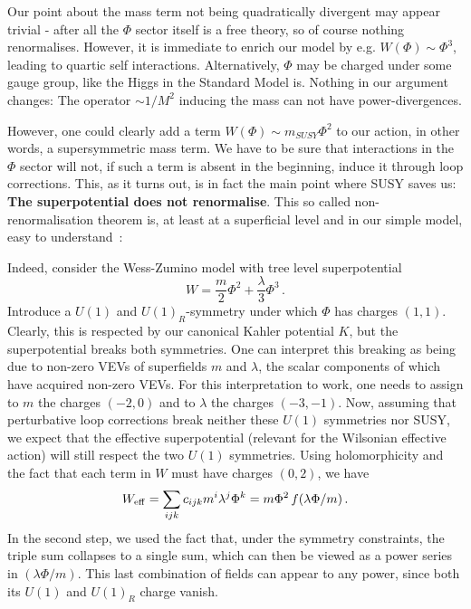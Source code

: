 \documentclass[12pt]{article}
\newcommand{\be}{\begin{equation}}
\newcommand{\ee}{\end{equation}}
\numberwithin{equation}{section}
\begin{document}
Our point about the mass term not being quadratically divergent may appear trivial - after all the $\Phi$ sector itself is a free theory, so of course nothing renormalises. However, it is immediate to enrich our model by e.g. $W(\Phi)\sim \Phi^3$, leading to quartic self interactions. Alternatively, $\Phi$ may be charged under some gauge group, like the Higgs in the Standard Model is. Nothing in our argument changes: The operator $\sim 1/M^2$ inducing the mass can not have power-divergences. 

However, one could clearly add a term $W(\Phi)\sim m_{SUSY}\Phi^2$ to our action, in other words, a supersymmetric mass term. We have to be sure that interactions in the $\Phi$ sector will not, if such a term is absent in the beginning, induce it through loop corrections. This, as it turns out, is in fact the main point where SUSY saves us: {\bf The superpotential does not renormalise}. This so called non-renormalisation theorem is, at least at a superficial level and in our simple model, easy to understand~\cite{Seiberg:1993vc}: 

Indeed, consider the Wess-Zumino model with tree level superpotential 
\be
W=\frac{m}{2}\Phi^2+\frac{\lambda}{3}\Phi^3\,.\label{mlf}
\ee
Introduce a $U(1)$ and $U(1)_R$-symmetry under which $\Phi$ has charges $(1,1)$. Clearly, this is respected by our canonical Kahler potential $K$, but the superpotential breaks both symmetries. One can interpret this breaking as being due to non-zero VEVs of superfields $m$ and $\lambda$, the scalar components of which have acquired non-zero VEVs. For this interpretation to work, one needs to assign to $m$ the charges $(-2,0)$ and to $\lambda$ the charges $(-3,-1)$. Now, assuming that perturbative loop corrections break neither these $U(1)$ symmetries nor SUSY, we expect that the effective superpotential (relevant for the Wilsonian effective action) will still respect the two $U(1)$ symmetries. Using holomorphicity and the fact that each term in $W$ must have charges $(0,2)$, we have
\be
W_{\rm eff}=\sum_{ijk}c_{ijk}m^i\lambda^j\Phi^k=m\Phi^2\,f(\lambda\Phi/m)\,.\label{ssp}
\ee
In the second step, we used the fact that, under the symmetry constraints, the triple sum collapses to a single sum, which can then be viewed as a power series in $(\lambda\Phi/m)$. This last combination of fields can appear to any power, since both its $U(1)$ and $U(1)_R$ charge vanish.
\end{document}
